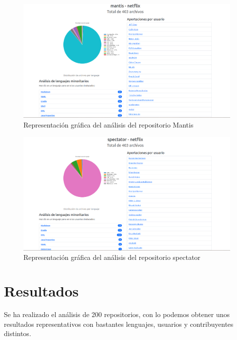 \documentclass[a4paper, 12pt]{book}
\begin{document}
\begin{figure}[H]
  \centering
  \includegraphics[width=1\textwidth]{img/mantis.png}
  \caption{Representación gráfica del análisis del repositorio Mantis}
  \label{figura:analisismantis}
\end{figure}
\begin{figure}[H]
  \centering
  \includegraphics[width=1\textwidth]{img/spectator.png}
  \caption{Representación gráfica del análisis del repositorio spectator}
  \label{figura:analisisspectator}
\end{figure}


\cleardoublepage
\chapter{Resultados}
\label{chap:resultados}

Se ha realizado el análisis de 200 repositorios, con lo podemos obtener unos resultados representativos con bastantes lenguajes, usuarios y contribuyentes distintos.
\end{document}
